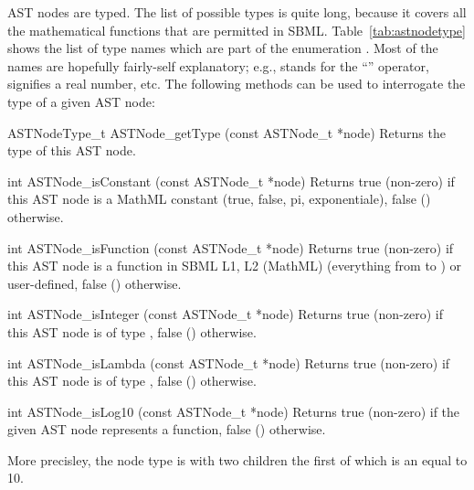 \documentclass{sbmlmanual}
\begin{document}
AST nodes are typed.  The list of possible types is quite long, because it
covers all the mathematical functions that are permitted in SBML.
Table~\vref{tab:astnodetype} shows the list of type names which are part of
the enumeration .  Most of the names are hopefully
fairly-self explanatory; e.g.,  stands for the ``\code{+}''
operator,  signifies a real number, etc.  The following
methods can be used to interrogate the type of a given AST node:


\begin{methoddef}{ASTNodeType\_t ASTNode\_getType (const ASTNode\_t *node)}
  Returns the type of this AST node.
\end{methoddef}


\begin{methoddef}{int ASTNode\_isConstant (const ASTNode\_t *node)}
  Returns true (non-zero) if this AST node is a MathML constant (true,
  false, pi, exponentiale), false () otherwise.
\end{methoddef}


\begin{methoddef}{int ASTNode\_isFunction (const ASTNode\_t *node)}
  Returns true (non-zero) if this AST node is a function in SBML L1, L2
  (MathML) (everything from  to ) or user-defined,
  false () otherwise.
\end{methoddef}


\begin{methoddef}{int ASTNode\_isInteger (const ASTNode\_t *node)}
  Returns true (non-zero) if this AST node is of type , false
  () otherwise.
\end{methoddef}


\begin{methoddef}{int ASTNode\_isLambda (const ASTNode\_t *node)}
  Returns true (non-zero) if this AST node is of type ,
  false () otherwise.
\end{methoddef}


\begin{methoddef}{int ASTNode\_isLog10 (const ASTNode\_t *node)}
  Returns true (non-zero) if the given AST node represents a 
  function, false () otherwise.
 
  More precisley, the node type is  with two
  children the first of which is an  equal to 10.
\end{methoddef}
\end{document}
